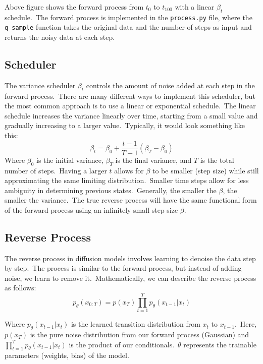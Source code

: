 \documentclass[12pt]{article}
\begin{document}
Above figure shows the forward process from \(t_0\) to \(t_{100}\) with a linear \({\beta _t}\) schedule.\
The forward process is implemented in the \texttt{process.py} file, where the \texttt{q\_sample} function takes the original data and the number of steps as input and returns the noisy data at each step.\

\subsection{Scheduler}
The variance scheduler \({\beta _t}\) controls the amount of noise added at each step in the forward process.\
There are many different ways to implement this scheduler, but the most common approach is to use a linear or exponential schedule.\
The linear schedule increases the variance linearly over time, starting from a small value and gradually increasing to a larger value.\
Typically, it would look something like this: 
\[{\beta _t} = {\beta _0} + \frac{{t - 1}}{{T - 1}}({\beta _T} - {\beta _0})\]
Where \({\beta _0}\) is the initial variance, \({\beta _T}\) is the final variance, and \(T\) is the total number of steps.\
Having a larger $t$ allows for $\beta$ to be smaller (step size) while still approximating the same limiting distribution.\
Smaller time steps allow for less ambiguity in determining previous states.\
Generally, the smaller the $\beta$, the smaller the variance.\
The true reverse process will have the same functional form of the forward process using an infinitely small step size $\beta$.\

\subsection {Reverse Process}
The reverse process in diffusion models involves learning to denoise the data step by step.\
The process is similar to the forward process, but instead of adding noise, we learn to remove it.\
Mathematically, we can describe the reverse process as follows:
\[{p_\theta }({x_{0:T}}) = p({x_T})\prod\limits_{t = 1}^T {{p_\theta }({x_{t - 1}}|{x_t})} \]

Where \({p_\theta }({x_{t - 1}}|{x_t})\) is the learned transition distribution from \({x_t}\) to \({x_{t - 1}}\).\
Here, \({p(x_T)}\) is the pure noise distribution from our forward process (Gaussian) and \(\prod\limits_{t = 1}^T {{p_\theta }({x_{t - 1}}|{x_t})}\) is the product of our conditionals.\
$\theta$ represents the trainable parameters (weights, bias) of the model.\\
\end{document}
